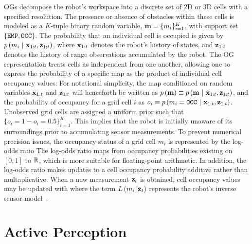 OGs decompose the robot's workspace into a discrete set of 2D or 3D cells with a
specified resolution. The presence or absence of obstacles within these cells is modeled
as a $K$-tuple binary random variable, $\mathbf{m} = \{m_{i}\}_{i=1}^{K}$, with support set
$\{\texttt{EMP}, \texttt{OCC}\}$. The probability that an individual cell is occupied is
given by $p\left(m_{i} \ \vert \ \mathbf{x}_{1:t}, \mathbf{z}_{1:t}\right)$, where $\mathbf{x}_{1:t}$ denotes the
robot's history of states, and $\mathbf{z}_{1:t}$ denotes the history of range observations
accumulated by the robot. The OG representation treats cells as independent from one another,
allowing one to express the probability of a specific map as the product of individual
cell occupancy values:
%
%
For notational simplicity, the map conditioned on random variables
$\mathbf{x}_{1:t}$ and $\mathbf{z}_{1:t}$ will henceforth be written as $p\left(\mathbf{m}\right)
\equiv p\left(\mathbf{m} \ \vert \ \mathbf{x}_{1:t}, \mathbf{z}_{1:t}\right)$, and the probability of occupancy
for a grid cell $i$ as $o_{i}\equiv p\left(m_{i}=\texttt{OCC}\ \vert \
\mbf{x}_{1:t}, \mbf{z}_{1:t}\right)$.
Unobserved grid cells are assigned a uniform prior such that
$\{o_{i} = 1 - o_{i} = 0.5\}_{i=1}^{K}$. This implies that the robot is
initially unaware of its surroundings prior to accumulating sensor measurements.
To prevent numerical precision issues, the
occupancy status of a grid cell $m_i$ is represented by the log-odds ratio
%
%
The log-odds ratio maps from occupancy probabilities existing on $[0, 1]$ to
${\mathbb{R}}$, which is more suitable for floating-point arithmetic. In addition,
the log-odds ratio makes updates to a cell occupancy probability additive rather
than multaplicative. When a new measurement $\mathbf{z}_t$ is obtained, cell occupancy values
may be updated with
%
%
where the term $L\left(m_{i}\,  \vert \mathbf{z}_{t}\right)$ represents the robot's inverse sensor model~\cite{thrun2005probabilistic}.

\section{Active Perception}
\label{sec:active_perception}

